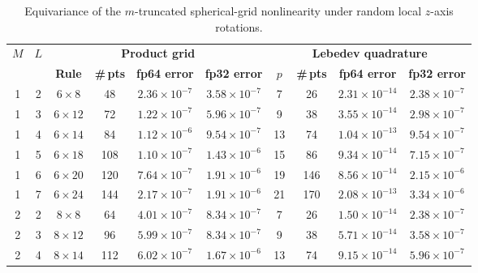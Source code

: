 \begin{table}[p]
    \PaperTableStyle
    \begin{threeparttable}
        \caption{Equivariance of the $m$-truncated spherical-grid nonlinearity under random local $z$-axis rotations.}
        \label{tab:sm_s2_truncated_equivariance}
        \begin{tabular*}{\linewidth}{@{\extracolsep{\fill}}cccccccccc@{}}
            \toprule
            \textbf{$M$} &
            \textbf{$L$} &
            \multicolumn{4}{c}{\textbf{Product grid}} &
            \multicolumn{4}{c}{\textbf{Lebedev quadrature}} \\
            \cmidrule(lr){3-6}\cmidrule(lr){7-10}
            & & \textbf{Rule} & \textbf{\#\,pts} & \textbf{fp64 error} & \textbf{fp32 error}
            & \textbf{$p$} & \textbf{\#\,pts} & \textbf{fp64 error} & \textbf{fp32 error} \\
            \midrule
            1 & 2 & $6\times8$   & 48  & $2.36\times10^{-7}$ & $3.58\times10^{-7}$ & 7  & 26  & $2.31\times10^{-14}$ & $2.38\times10^{-7}$ \\
            1 & 3 & $6\times12$  & 72  & $1.22\times10^{-7}$ & $5.96\times10^{-7}$ & 9  & 38  & $3.55\times10^{-14}$ & $2.98\times10^{-7}$ \\
            1 & 4 & $6\times14$  & 84  & $1.12\times10^{-6}$ & $9.54\times10^{-7}$ & 13 & 74  & $1.04\times10^{-13}$ & $9.54\times10^{-7}$ \\
            1 & 5 & $6\times18$  & 108 & $1.10\times10^{-7}$ & $1.43\times10^{-6}$ & 15 & 86  & $9.34\times10^{-14}$ & $7.15\times10^{-7}$ \\
            1 & 6 & $6\times20$  & 120 & $7.64\times10^{-7}$ & $1.91\times10^{-6}$ & 19 & 146 & $8.56\times10^{-14}$ & $2.15\times10^{-6}$ \\
            1 & 7 & $6\times24$  & 144 & $2.17\times10^{-7}$ & $1.91\times10^{-6}$ & 21 & 170 & $2.08\times10^{-13}$ & $3.34\times10^{-6}$ \\
            \midrule
            2 & 2 & $8\times8$   & 64  & $4.01\times10^{-7}$ & $8.34\times10^{-7}$ & 7  & 26  & $1.50\times10^{-14}$ & $2.38\times10^{-7}$ \\
            2 & 3 & $8\times12$  & 96  & $5.99\times10^{-7}$ & $8.34\times10^{-7}$ & 9  & 38  & $5.71\times10^{-14}$ & $3.58\times10^{-7}$ \\
            2 & 4 & $8\times14$  & 112 & $6.02\times10^{-7}$ & $1.67\times10^{-6}$ & 13 & 74  & $9.15\times10^{-14}$ & $5.96\times10^{-7}$ \\

\end{tabular*}
\end{threeparttable}
\end{table}
